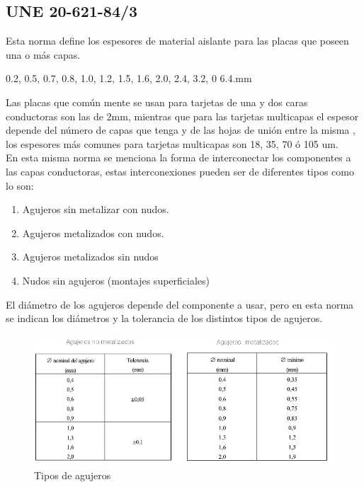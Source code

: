 \documentclass[a4paper,12pt,twoside]{proyectotanquesecci}
\begin{document}
\subsection{UNE  20-621-84/3}

Esta norma define  los espesores de material aislante para las placas que poseen una o más capas.

\begin{center}
0.2, 0.5, 0.7, 0.8, 1.0, 1.2, 1.5, 1.6, 2.0, 2.4, 3.2, 0 6.4.mm
\end{center}

Las placas que común mente se usan para  tarjetas de una y dos caras conductoras son las  de 2mm, mientras que para las tarjetas multicapas  el espesor depende del número de capas que tenga  y de las hojas de unión entre la misma , los espesores más comunes para tarjetas multicapas son 18, 35, 70 ó 105 um.\\

En esta misma norma  se menciona la forma de interconectar los componentes  a las capas conductoras, estas interconexiones pueden ser de diferentes tipos como lo son:

\begin{enumerate}
\item Agujeros sin metalizar con nudos.
\item Agujeros metalizados con nudos.
\item Agujeros metalizados sin nudos 
\item Nudos sin agujeros (montajes superficiales)
\end{enumerate}

El diámetro de los agujeros depende del componente a usar,  pero en esta norma  se indican los diámetros y la tolerancia de los distintos tipos de agujeros.

\begin{figure}[h]
\centering
\includegraphics[scale=0.8]{tabla1.jpg}
\renewcommand{\figurename}{Fig.}
\caption{Tipos de agujeros}
\label{Tipos de agujeros}
\end{figure}
\end{document}
